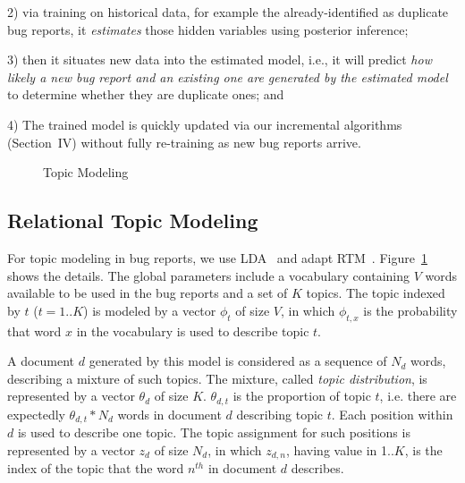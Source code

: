 2) via training on historical data, for example the already-identified
   as duplicate bug reports, it {\em estimates} those hidden variables
   using posterior inference;

3) then it situates new data into the estimated model, i.e., it will
   predict {\em how likely a new bug report and an existing one are
   generated by the estimated model} to determine whether they are
   duplicate ones; and

4) The trained model is quickly updated via our incremental algorithms
   (Section~IV) without fully re-training as new bug reports arrive.


\begin{figure}
\centerline{\epsfxsize=3.2in }
\caption{Topic Modeling~\cite{lda}}
\label{topicmodel}
\end{figure}


\subsection{Relational Topic Modeling}

For topic modeling in bug reports, we use LDA~\cite{lda} and adapt
RTM~\cite{RTM}. Figure~\ref{topicmodel} shows the details.  The global
parameters include a vocabulary containing $V$ words available to be
used in the bug reports and a set of $K$ topics. The topic indexed by
$t$ ($t=1..K$) is modeled by a vector $\phi_t$ of size $V$, in which
$\phi_{t,x}$ is the probability that word $x$ in the vocabulary is
used to describe topic $t$.

A document $d$ generated by this model is considered as a sequence of
$N_d$ words, describing a mixture of such topics. The mixture, called
{\em topic distribution}, is represented by a vector $\theta_d$ of
size $K$. $\theta_{d,t}$ is the proportion of topic $t$, i.e. there
are expectedly $\theta_{d,t}*N_d$ words in document $d$ describing
topic $t$. Each position within $d$ is used to describe one topic. The
topic assignment for such positions is represented by a vector $z_d$
of size $N_d$, in which $z_{d,n}$, having value in 1..$K$, is the
index of the topic that the word $n^{th}$ in document $d$ describes.

